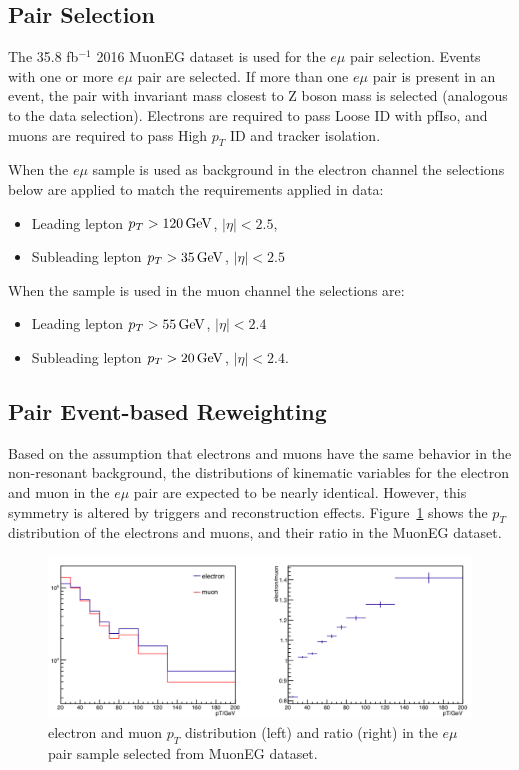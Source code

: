\subsection{ Pair Selection}
The 35.8 fb$^{-1}$ 2016 MuonEG dataset is used for the $e\mu$ pair selection.  Events with one or more $e\mu$ pair are selected. If more than one $e\mu$ pair is present in an event, the pair with invariant mass closest to Z boson mass is selected (analogous to the data selection). Electrons are required to pass Loose ID with pfIso, and muons are required to pass High $p_T$ ID and tracker isolation. 

\vspace{0.3cm}
When the $e\mu$ sample is used as background in the electron channel the selections below are applied to match the requirements applied in data: 
\begin{itemize}
\item Leading lepton $p_{T}>120\,\text{Ge\hspace{-.08em}V}$, $|\eta|<2.5$, 
\item Subleading lepton $p_{T}>35\,\text{Ge\hspace{-.08em}V}$, $|\eta|<2.5$
\end{itemize}
When the sample is used in the muon channel the selections are:
\begin{itemize}
\item Leading lepton $p_{T}>55\,\text{Ge\hspace{-.08em}V}$, $|\eta|<2.4$
\item Subleading lepton $p_{T}>20\,\text{Ge\hspace{-.08em}V}$, $|\eta|<2.4$. 
\end{itemize}

\subsection{ Pair Event-based Reweighting}
Based on the assumption that electrons and muons have the same behavior in the non-resonant background, the distributions of kinematic variables for the electron and muon in the $e\mu$ pair are expected to be nearly identical. However, this symmetry is altered by triggers and reconstruction effects. Figure~\ref{fig:nonresmuelpt} shows the $p_T$ distribution of the electrons and muons, and their ratio in the MuonEG dataset.

\begin{figure}[htbp]
\begin{center}
\includegraphics[width=0.95\linewidth]{figures/nonresmuelpt.png}
\caption{electron and muon $p_T$ distribution (left) and ratio (right) in the $e\mu$ pair sample selected from MuonEG dataset.}
\label{fig:nonresmuelpt}
\end{center}
\end{figure}


